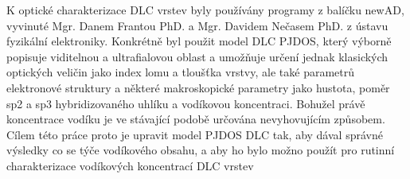 K optické charakterizace DLC vrstev byly používány programy z balíčku newAD, vyvinuté Mgr. Danem Frantou PhD. a Mgr. Davidem Nečasem PhD. z ústavu fyzikální elektroniky. Konkrétně byl použit model DLC PJDOS, který výborně popisuje viditelnou a ultrafialovou oblast a umožňuje určení jednak klasických optických veličin jako index lomu a tloušťka vrstvy, ale také parametrů elektronové struktury a některé makroskopické parametry jako hustota, poměr sp2 a sp3 hybridizovaného uhlíku a vodíkovou koncentraci. Bohužel právě koncentrace vodíku je ve stávající podobě určována nevyhovujícím způsobem. Cílem této práce proto je upravit model PJDOS DLC tak, aby dával správné výsledky co se týče vodíkového obsahu, a aby ho bylo možno použít pro rutinní charakterizace vodíkových koncentrací DLC vrstev
 
\cleardoublepage

